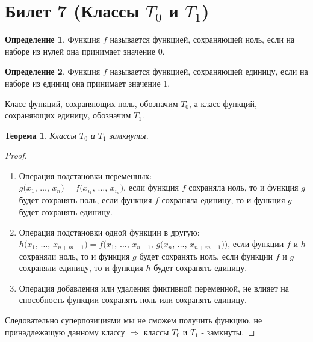 \documentclass[a4paper, 12pt]{article}
\theoremstyle{definition}
\newtheorem*{definition}{Определение}
\theoremstyle{plain}
\newtheorem*{theorem}{Теорема}
\theoremstyle{remark}
\begin{document}
  \section{Билет 7 (Классы $T_0$ и $T_1$)}
  \begin{definition}
    Функция $f$ называется функцией, сохраняющей ноль, если на наборе из нулей она принимает значение 0. 
  \end{definition}
  \begin{definition}
    Функция $f$ называется функцией, сохраняющей единицу, если на наборе из единиц она принимает значение 1. 
  \end{definition}
  Класс функций, сохраняющих ноль, обозначим $T_0$, а класс функций, сохраняющих единицу, обозначим $T_1$.
  \begin{theorem}
    Классы $T_0$ и $T_1$ замкнуты.
  \end{theorem}
  \begin{proof}
    \begin{enumerate}
      \item Операция подстановки переменных:\\
      $g(x_1$, $\ldots$, $x_n)=f(x_{i_1}$, $\ldots$, $x_{i_n})$, если функция $f$ сохраняла ноль, то и функция $g$ будет сохранять ноль, если функция $f$ сохраняла единицу, то и функция $g$ будет сохранять единицу.
      \item Операция подстановки одной функции в другую:\\
      $h(x_1$, $\ldots$, $x_{n+m-1})=f(x_1$, $\ldots$, $x_{n-1}$, $g(x_n$, $\ldots$, $x_{n+m-1}))$, если функции $f$ и $h$ сохраняли ноль, то и функция $g$ будет сохранять ноль, если функции $f$ и $g$ сохраняли единицу, то и функция $h$ будет сохранять единицу.
      \item Операция добавления или удаления фиктивной переменной, не влияет на способность функции сохранять ноль или сохранять единицу.
    \end{enumerate}
    Следовательно суперпозициями мы не сможем получить функцию, не принадлежащую данному классу $\Longrightarrow$ классы $T_0$ и $T_1$ - замкнуты. 
  \end{proof}
\end{document}
